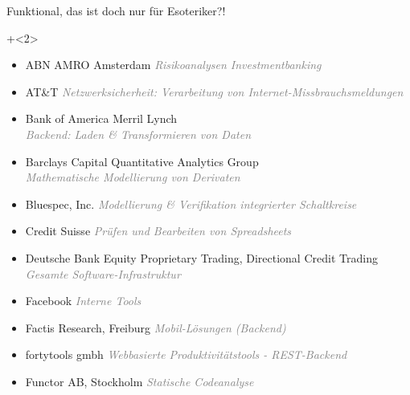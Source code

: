 \begin{frame}[fragile]{Funktional, das ist doch nur für Esoteriker?!}

\onslide+<2>
\begin{itemize}
\item ABN AMRO Amsterdam \textcolor{gray}{\textit{Risikoanalysen Investmentbanking}}
\item AT\&T \textcolor{gray}{\textit{Netzwerksicherheit: Verarbeitung von Internet-Missbrauchsmeldungen}}
\item Bank of America Merril Lynch \\ \textcolor{gray}{\textit{Backend: Laden \& Transformieren von Daten}}
\item Barclays Capital Quantitative Analytics Group \\ \textcolor{gray}{\textit{Mathematische Modellierung von Derivaten}}
\item Bluespec, Inc. \textcolor{gray}{\textit{Modellierung \& Verifikation integrierter Schaltkreise}}
\item Credit Suisse \textcolor{gray}{\textit{Prüfen und Bearbeiten von Spreadsheets}}
\item Deutsche Bank Equity Proprietary Trading, Directional Credit Trading \textcolor{gray}{\textit{Gesamte Software-Infrastruktur}}
\item Facebook \textcolor{gray}{\textit{Interne Tools}}
\item Factis Research, Freiburg \textcolor{gray}{\textit{Mobil-Lösungen (Backend)}}
\item fortytools gmbh \textcolor{gray}{\textit{Webbasierte Produktivitätstools - REST-Backend}}
\item Functor AB, Stockholm \textcolor{gray}{\textit{Statische Codeanalyse}}
\end{itemize}
\end{frame}


